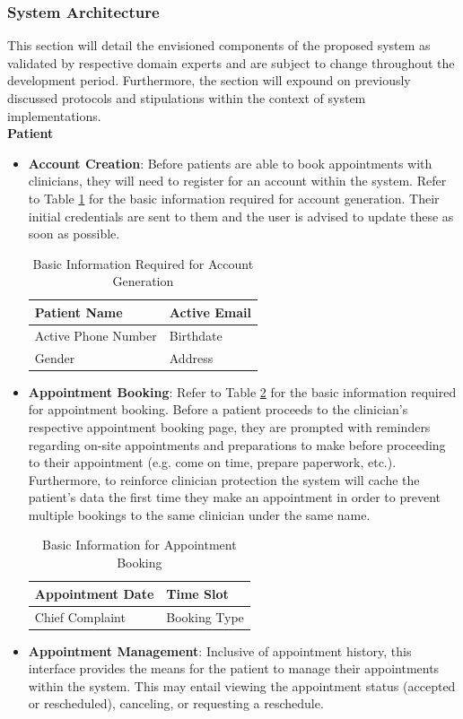 \documentclass[11pt,a4paper,titlepage]{article}
\begin{document}
	\subsubsection{System Architecture}
	This section will detail the envisioned components of the proposed system as validated by respective domain experts \cite{Rodriguez_A, Nicolas_AJ} and are subject to change throughout the development period. Furthermore, the section will expound on previously discussed protocols and stipulations within the context of system implementations. 
	\\ \textbf{Patient}
	\begin{itemize}
		\item \textbf{Account Creation}: Before patients are able to book appointments with clinicians, they will need to register for an account within the system. Refer to Table \ref{tab:basic_info} for the basic information required for account generation. Their initial credentials are sent to them and the user is advised to update these as soon as possible. 
		\begin{table}[htbp]
			\centering
			\begin{tabular}{|l|l|}
				\hline
				Patient Name        & Active Email \\ \hline
				Active Phone Number & Birthdate    \\ \hline
				Gender              & Address      \\ \hline
			\end{tabular}
			\caption{Basic Information Required for Account Generation}
			\label{tab:basic_info}
		\end{table}
		\item \textbf{Appointment Booking}: Refer to Table \ref{tab:appt-info} for the basic information required for appointment booking. Before a patient proceeds to the clinician's respective appointment booking page, they are prompted with reminders regarding on-site appointments and preparations to make before proceeding to their appointment (e.g. come on time, prepare paperwork, etc.). Furthermore, to reinforce clinician protection the system will cache the patient's data the first time they make an appointment in order to prevent multiple bookings to the same clinician under the same name.
		\begin{table}[htbp]
			\centering
			\begin{tabular}{|l|l|}
				\hline
				Appointment Date & Time Slot \\ \hline
				Chief Complaint  & Booking Type\\ \hline
			\end{tabular}
			\caption{Basic Information for Appointment Booking}
			\label{tab:appt-info}
		\end{table}
		\item \textbf{Appointment Management}: Inclusive of appointment history, this interface provides the means for the patient to manage their appointments within the system. This may entail viewing the appointment status (accepted or rescheduled), canceling, or requesting a reschedule.
	\end{itemize}
\end{document}
